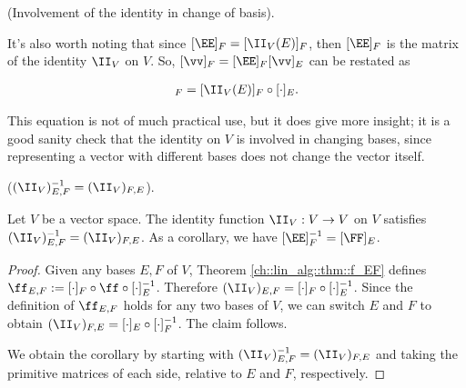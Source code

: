 \begin{remark}
    (Involvement of the identity in change of basis).
    
    It's also worth noting that since $[\EE]_F = [\II_V(E)]_F$, then $[\EE]_F$ is the matrix of the identity $\II_V$ on $V$. So, $[\vv]_F = [\EE]_F [\vv]_E$ can be restated as
    
    \begin{align*}
        [\cdot]_F = [\II_V(E)]_F \circ [\cdot]_E.
    \end{align*}
    
    This equation is not of much practical use, but it does give more insight; it is a good sanity check that the identity on $V$ is involved in changing bases, since representing a vector with different bases does not change the vector itself.
\end{remark}

\begin{theorem}
\label{ch::lin_alg::thm::I_EF}
    ($(\II_V)_{E,F}^{-1} = (\II_V)_{F,E}$).
    
    Let $V$ be a vector space. The identity function $\II_V:V \rightarrow V$ on $V$ satisfies $(\II_V)_{E,F}^{-1} = (\II_V)_{F,E}$. As a corollary, we have $[\EE]_F^{-1} = [\FF]_E$.
\end{theorem}

\begin{proof}
    Given any bases $E, F$ of $V$, Theorem \ref{ch::lin_alg::thm::f_EF} defines $\ff_{E,F} := [\cdot]_F \circ \ff \circ [\cdot]_E^{-1}$. Therefore $(\II_V)_{E,F} = [\cdot]_F \circ [\cdot]_E^{-1}$. Since the definition of $\ff_{E,F}$ holds for any two bases of $V$, we can switch $E$ and $F$ to obtain $(\II_V)_{F,E} = [\cdot]_E \circ [\cdot]_F^{-1}$. The claim follows.
    
    We obtain the corollary by starting with $(\II_V)_{E,F}^{-1} = (\II_V)_{F,E}$ and taking the primitive matrices of each side, relative to $E$ and $F$, respectively.
\end{proof}

